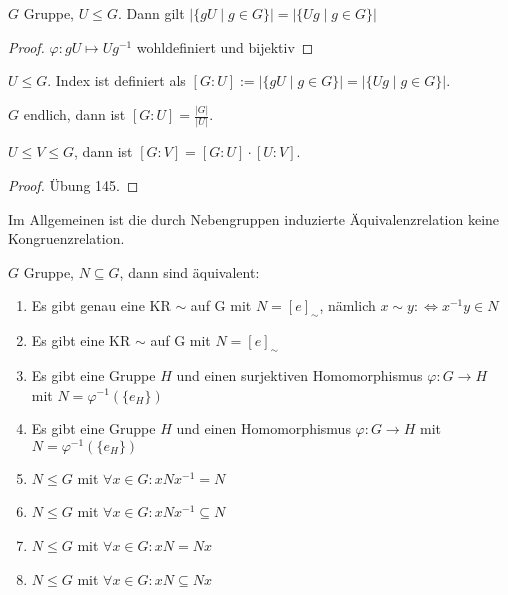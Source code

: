 \begin{lemma}
    $G$ Gruppe, $U \le G$. Dann gilt $\vert \{gU \mid g \in G\}\vert = \vert \{Ug \mid g \in G\}\vert$
\end{lemma}
\begin{proof}
    $\varphi: gU \mapsto Ug^{-1}$ wohldefiniert und bijektiv
\end{proof}

\begin{definition}
    $U \le G$. Index ist definiert als $[G:U] := \vert \{gU \mid g \in G\}\vert = \vert \{Ug \mid g \in G\}\vert$. 
\end{definition}

\begin{remark}
    $G$ endlich, dann ist $[G:U] = \frac{\vert G \vert}{\vert U \vert}$.
\end{remark}

\begin{theorem}[Indexsatz]
    $U \le V \le G$, dann ist $[G:V] = [G:U] \cdot [U:V]$. 
\end{theorem}
\begin{proof}
    Übung 145.
\end{proof}

Im Allgemeinen ist die durch Nebengruppen induzierte Äquivalenzrelation keine Kongruenzrelation.

\begin{theorem}
    $G$ Gruppe, $N \subseteq G$, dann sind äquivalent:
    \begin{enumerate}[label=(\alph*)]
        \item Es gibt genau eine KR $\sim$ auf G mit $N = [e]_\sim$, nämlich $x \sim y: \Leftrightarrow x^{-1}y \in N$
        \item Es gibt eine KR $\sim$ auf G mit $N = [e]_\sim$
        \item Es gibt eine Gruppe $H$ und einen surjektiven Homomorphismus $\varphi: G \to H$ mit $N = \varphi^{-1}(\{e_H\})$
        \item Es gibt eine Gruppe $H$ und einen Homomorphismus $\varphi: G \to H$ mit $N = \varphi^{-1}(\{e_H\})$
        \item $N \le G$ mit $\forall x \in G: xNx^{-1} = N$
        \item $N \le G$ mit $\forall x \in G: xNx^{-1} \subseteq N$
        \item $N \le G$ mit $\forall x \in G: xN = Nx$
        \item $N \le G$ mit $\forall x \in G: xN \subseteq Nx$
    \end{enumerate}
\end{theorem}

